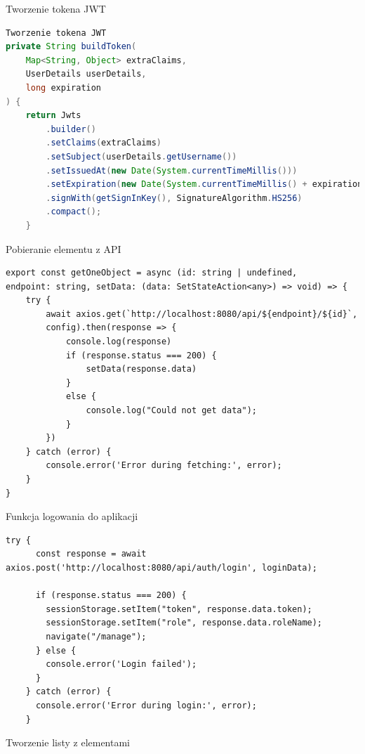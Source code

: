 \documentclass[12pt]{article}
\begin{document}
Tworzenie tokena JWT
\begin{lstlisting}[language=Java]
Tworzenie tokena JWT
private String buildToken(
    Map<String, Object> extraClaims,
    UserDetails userDetails,
    long expiration
) {
    return Jwts
        .builder()
        .setClaims(extraClaims)
        .setSubject(userDetails.getUsername())
        .setIssuedAt(new Date(System.currentTimeMillis()))
        .setExpiration(new Date(System.currentTimeMillis() + expiration))
        .signWith(getSignInKey(), SignatureAlgorithm.HS256)
        .compact();
    }
\end{lstlisting}
\newpage
Pobieranie elementu z API
\begin{lstlisting}
export const getOneObject = async (id: string | undefined, 
endpoint: string, setData: (data: SetStateAction<any>) => void) => {
    try {
        await axios.get(`http://localhost:8080/api/${endpoint}/${id}`, 
        config).then(response => {
            console.log(response)
            if (response.status === 200) {
                setData(response.data)
            }
            else {
                console.log("Could not get data");
            }
        })
    } catch (error) {
        console.error('Error during fetching:', error);
    }
}
\end{lstlisting}
Funkcja logowania do aplikacji
\begin{lstlisting}
try {
      const response = await axios.post('http://localhost:8080/api/auth/login', loginData);

      if (response.status === 200) {
        sessionStorage.setItem("token", response.data.token);
        sessionStorage.setItem("role", response.data.roleName);
        navigate("/manage");
      } else {
        console.error('Login failed');
      }
    } catch (error) {
      console.error('Error during login:', error);
    }
\end{lstlisting}
\newpage
Tworzenie listy z elementami
\end{document}
